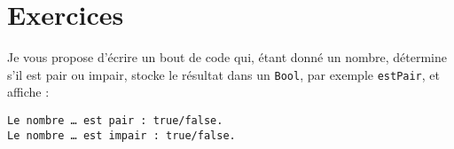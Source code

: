 \section*{Exercices}
{}
Je vous propose d'écrire un bout de code qui, étant donné un nombre,
détermine s'il est pair ou impair, stocke le résultat dans un \texttt{Bool}, par exemple \texttt{estPair}, et affiche :
\begin{verbatim}
Le nombre … est pair : true/false.
Le nombre … est impair : true/false.
\end{verbatim}


